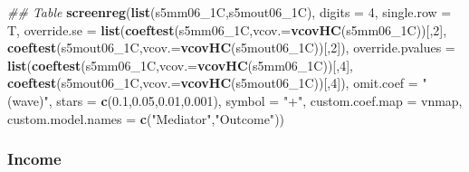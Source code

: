 \documentclass[
]{article}
\newenvironment{Shaded}{\begin{snugshade}}{\end{snugshade}}
\newcommand{\CommentTok}[1]{\textcolor[rgb]{0.56,0.35,0.01}{\textit{#1}}}
\newcommand{\DataTypeTok}[1]{\textcolor[rgb]{0.13,0.29,0.53}{#1}}
\newcommand{\DecValTok}[1]{\textcolor[rgb]{0.00,0.00,0.81}{#1}}
\newcommand{\FloatTok}[1]{\textcolor[rgb]{0.00,0.00,0.81}{#1}}
\newcommand{\KeywordTok}[1]{\textcolor[rgb]{0.13,0.29,0.53}{\textbf{#1}}}
\newcommand{\NormalTok}[1]{#1}
\newcommand{\StringTok}[1]{\textcolor[rgb]{0.31,0.60,0.02}{#1}}
\begin{document}
\begin{Shaded}
\begin{Highlighting}[]
\CommentTok{## Table}
\KeywordTok{screenreg}\NormalTok{(}\KeywordTok{list}\NormalTok{(s5mm06_1C,s5mout06_1C), }\DataTypeTok{digits =} \DecValTok{4}\NormalTok{, }\DataTypeTok{single.row =}\NormalTok{ T,}
          \DataTypeTok{override.se =} \KeywordTok{list}\NormalTok{(}\KeywordTok{coeftest}\NormalTok{(s5mm06_1C,}\DataTypeTok{vcov.=}\KeywordTok{vcovHC}\NormalTok{(s5mm06_1C))[,}\DecValTok{2}\NormalTok{],}
                             \KeywordTok{coeftest}\NormalTok{(s5mout06_1C,}\DataTypeTok{vcov.=}\KeywordTok{vcovHC}\NormalTok{(s5mout06_1C))[,}\DecValTok{2}\NormalTok{]),}
          \DataTypeTok{override.pvalues =} \KeywordTok{list}\NormalTok{(}\KeywordTok{coeftest}\NormalTok{(s5mm06_1C,}\DataTypeTok{vcov.=}\KeywordTok{vcovHC}\NormalTok{(s5mm06_1C))[,}\DecValTok{4}\NormalTok{],}
                                  \KeywordTok{coeftest}\NormalTok{(s5mout06_1C,}\DataTypeTok{vcov.=}\KeywordTok{vcovHC}\NormalTok{(s5mout06_1C))[,}\DecValTok{4}\NormalTok{]),}
          \DataTypeTok{omit.coef =} \StringTok{"(wave)"}\NormalTok{, }\DataTypeTok{stars =} \KeywordTok{c}\NormalTok{(}\FloatTok{0.1}\NormalTok{,}\FloatTok{0.05}\NormalTok{,}\FloatTok{0.01}\NormalTok{,}\FloatTok{0.001}\NormalTok{), }\DataTypeTok{symbol =} \StringTok{"+"}\NormalTok{,}
          \DataTypeTok{custom.coef.map =}\NormalTok{ vnmap, }
          \DataTypeTok{custom.model.names =} \KeywordTok{c}\NormalTok{(}\StringTok{"Mediator"}\NormalTok{,}\StringTok{"Outcome"}\NormalTok{))}
\end{Highlighting}
\end{Shaded}

\hypertarget{income}{%
\subsubsection{Income}\label{income}}
\end{document}
